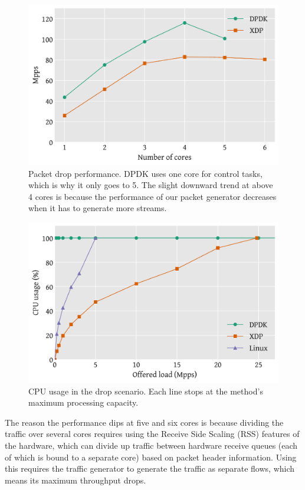 \documentclass[10pt,sigconf]{acmart}
\begin{document}
\begin{figure}[t]
\centering
\includegraphics[width=\linewidth]{figures/drop-test.pdf}
\caption{\label{fig:drop-test} Packet drop performance. DPDK uses one core for
  control tasks, which is why it only goes to 5. The slight downward trend at
  above 4 cores is because the performance of our packet generator decreases
  when it has to generate more streams.}
\end{figure}

\begin{figure}[t]
\centering
\includegraphics[width=\linewidth]{figures/drop-cpu.pdf}
\caption{\label{fig:drop-cpu} CPU usage in the drop scenario. Each line stops at
the method's maximum processing capacity.}
\end{figure}


The reason the performance dips at five and six cores is because dividing the
traffic over several cores requires using the Receive Side Scaling (RSS)
features of the hardware, which can divide up traffic between hardware receive
queues (each of which is bound to a separate core) based on packet header
information. Using this requires the traffic generator to generate the traffic
as separate flows, which means its maximum throughput drops.
\end{document}
